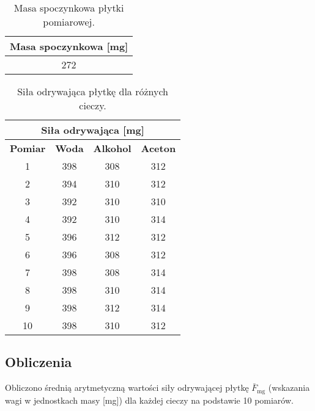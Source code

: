 \documentclass[a4paper,12pt]{article}
\begin{document}
\begin{table}[H]
    \centering
    \begin{tabular}{|c|}
        \hline
        \textbf{Masa spoczynkowa [mg]} \\
        \hline
        272 \\
        \hline
    \end{tabular}
    \caption{Masa spoczynkowa płytki pomiarowej.}
    \label{tab:masa_spoczynkowa}
\end{table}

\begin{table}[H]
    \centering
    \begin{tabular}{|c|c|c|c|}
        \hline
        \multicolumn{4}{|c|}{\textbf{Siła odrywająca [mg]}} \\
        \hline
        \textbf{Pomiar} & \textbf{Woda} & \textbf{Alkohol} & \textbf{Aceton} \\
        \hline
        1 & 398 & 308 & 312 \\ %
        \hline
        2 & 394 & 310 & 312 \\ %
        \hline
        3 & 392 & 310 & 310 \\ %
        \hline
        4 & 392 & 310 & 314 \\ %
        \hline
        5 & 396 & 312 & 312 \\ %
        \hline
        6 & 396 & 308 & 312 \\ %
        \hline
        7 & 398 & 308 & 314 \\ %
        \hline
        8 & 398 & 310 & 314 \\ %
        \hline
        9 & 398 & 312 & 314 \\ %
        \hline
        10 & 398 & 310 & 312 \\ %
        \hline
    \end{tabular}
    \caption{Siła odrywająca płytkę dla różnych cieczy.}
    \label{tab:sila_odrywania}
\end{table}

\subsection{Obliczenia}

Obliczono średnią arytmetyczną wartości siły odrywającej płytkę $\bar{F}_{\text{mg}}$ (wskazania wagi w jednostkach masy [mg]) dla każdej cieczy na podstawie 10 pomiarów.
\end{document}
